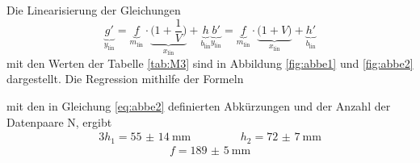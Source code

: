Die Linearisierung der Gleichungen
\begin{subequations}
\begin{equation}
	\underbrace{g'}_{y_\text{lin}}=\underbrace{f}_{m_\text{lin}}\cdot\underbrace{\biggl(1+\frac{1}{V}\biggr)}_{x_\text{lin}}+\underbrace{h}_{b_\text{lin}}
	\label{eq:abbe1}
	\end{equation}
	\begin{equation}
	\underbrace{b'}_{y_\text{lin}}=\underbrace{f}_{m_\text{lin}}\cdot\underbrace{\bigl(1+V\bigr)}_{x_\text{lin}}+\underbrace{h'}_{b_\text{lin}}
	\label{eq:abbe2}
\end{equation}
\end{subequations}
mit den Werten der Tabelle \ref{tab:M3} sind in Abbildung \ref{fig:abbe1} und \ref{fig:abbe2} dargestellt.
Die Regression mithilfe der Formeln
 
mit den in Gleichung \eqref{eq:abbe2} definierten Abkürzungen und der Anzahl der Datenpaare N, ergibt
\begin{alignat}{3}
	h_1 = \SI{55(14)}{\milli\meter} & \qquad&&h_2 = \SI{72(7)}{\milli\meter}
\end{alignat}
\begin{equation}
	f = \SI{189(5)}{\milli\meter}
\end{equation}


